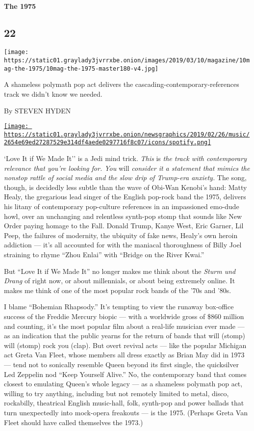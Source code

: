 \hypertarget{the-1975}{%
\paragraph{The 1975}\label{the-1975}}

\hypertarget{22}{%
\subsection{22}\label{22}}

\texttt{[image: https://static01.graylady3jvrrxbe.onion/images/2019/03/10/magazine/10mag-the-1975/10mag-the-1975-master180-v4.jpg]}

A shameless polymath pop act delivers the
cascading-contemporary-references track we didn't know we needed.

By STEVEN HYDEN

\href{https://open.spotify.com/track/6WmIyn2fx1PKQ0XDpYj4VR}{\texttt{[image: https://static01.graylady3jvrrxbe.onion/newsgraphics/2019/02/26/music/2654e69ed27287529e314df4aede0297716f8c07/icons/spotify.png]}}

`Love It if We Made It'' is a Jedi mind trick. \emph{This} is \emph{the
track with contemporary relevance that you're looking for. You} will
\emph{consider it a statement that mimics the nonstop rattle of social
media and the slow drip of Trump-era anxiety.} The song, though, is
decidedly less subtle than the wave of Obi-Wan Kenobi's hand: Matty
Healy, the gregarious lead singer of the English pop-rock band the 1975,
delivers his litany of contemporary pop-culture references in an
impassioned emo-dude howl, over an unchanging and relentless synth-pop
stomp that sounds like New Order paying homage to the Fall. Donald
Trump, Kanye West, Eric Garner, Lil Peep, the failures of modernity, the
ubiquity of fake news, Healy's own heroin addiction --- it's all
accounted for with the maniacal thoroughness of Billy Joel straining to
rhyme ``Zhou Enlai'' with ``Bridge on the River Kwai.''

But ``Love It if We Made It'' no longer makes me think about the
\emph{Sturm und Drang} of right now, or about millennials, or about
being extremely online. It makes me think of one of the most popular
rock bands of the '70s and '80s.

I blame ``Bohemian Rhapsody.'' It's tempting to view the runaway
box-office success of the Freddie Mercury biopic --- with a worldwide
gross of \$860 million and counting, it's the most popular film about a
real-life musician ever made --- as an indication that the public yearns
for the return of bands that will (stomp) will (stomp) rock you (clap).
But overt revival acts --- like the popular Michigan act Greta Van
Fleet, whose members all dress exactly as Brian May did in 1973 --- tend
not to sonically resemble Queen beyond its first single, the quicksilver
Led Zeppelin nod ``Keep Yourself Alive.'' No, the contemporary band that
comes closest to emulating Queen's whole legacy --- as a shameless
polymath pop act, willing to try anything, including but not remotely
limited to metal, disco, rockabilly, theatrical English music-hall,
folk, synth-pop and power ballads that turn unexpectedly into mock-opera
freakouts --- is the 1975. (Perhaps Greta Van Fleet should have called
themselves the 1973.)


